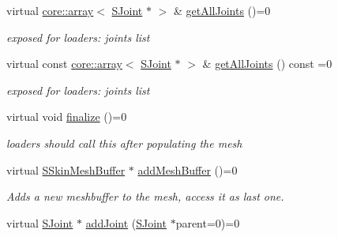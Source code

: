 \begin{DoxyCompactItemize}
virtual \hyperlink{classirr_1_1core_1_1array}{core\+::array}$<$ \hyperlink{structirr_1_1scene_1_1ISkinnedMesh_1_1SJoint}{S\+Joint} $\ast$ $>$ \& \hyperlink{classirr_1_1scene_1_1ISkinnedMesh_a4fcdc38666f24a092191668ff909936f}{get\+All\+Joints} ()=0
\begin{DoxyCompactList}\small\item\em exposed for loaders\+: joints list \end{DoxyCompactList}\item 
\mbox{\label{classirr_1_1scene_1_1ISkinnedMesh_a8dcc5dc083cd93a349acd0a2e01da539}} 
virtual const \hyperlink{classirr_1_1core_1_1array}{core\+::array}$<$ \hyperlink{structirr_1_1scene_1_1ISkinnedMesh_1_1SJoint}{S\+Joint} $\ast$ $>$ \& \hyperlink{classirr_1_1scene_1_1ISkinnedMesh_a8dcc5dc083cd93a349acd0a2e01da539}{get\+All\+Joints} () const =0
\begin{DoxyCompactList}\small\item\em exposed for loaders\+: joints list \end{DoxyCompactList}\item 
\mbox{\label{classirr_1_1scene_1_1ISkinnedMesh_a83549df06904513c439c92e34b424b02}} 
virtual void \hyperlink{classirr_1_1scene_1_1ISkinnedMesh_a83549df06904513c439c92e34b424b02}{finalize} ()=0
\begin{DoxyCompactList}\small\item\em loaders should call this after populating the mesh \end{DoxyCompactList}\item 
\mbox{\label{classirr_1_1scene_1_1ISkinnedMesh_abc55b0dc2c1e80ef5fa4cab8e17b76af}} 
virtual \hyperlink{structirr_1_1scene_1_1SSkinMeshBuffer}{S\+Skin\+Mesh\+Buffer} $\ast$ \hyperlink{classirr_1_1scene_1_1ISkinnedMesh_abc55b0dc2c1e80ef5fa4cab8e17b76af}{add\+Mesh\+Buffer} ()=0
\begin{DoxyCompactList}\small\item\em Adds a new meshbuffer to the mesh, access it as last one. \end{DoxyCompactList}\item 
\mbox{\label{classirr_1_1scene_1_1ISkinnedMesh_a713edfbc7f3e9394487882156dc6fe2f}} 
virtual \hyperlink{structirr_1_1scene_1_1ISkinnedMesh_1_1SJoint}{S\+Joint} $\ast$ \hyperlink{classirr_1_1scene_1_1ISkinnedMesh_a713edfbc7f3e9394487882156dc6fe2f}{add\+Joint} (\hyperlink{structirr_1_1scene_1_1ISkinnedMesh_1_1SJoint}{S\+Joint} $\ast$parent=0)=0

\end{DoxyCompactItemize}
